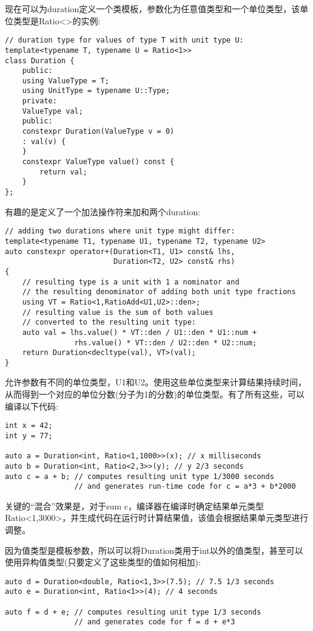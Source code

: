 现在可以为duration定义一个类模板，参数化为任意值类型和一个单位类型，该单位类型是Ratio<>的实例:

\begin{lstlisting}[style=styleCXX]
// duration type for values of type T with unit type U:
template<typename T, typename U = Ratio<1>>
class Duration {
	public:
	using ValueType = T;
	using UnitType = typename U::Type;
	private:
	ValueType val;
	public:
	constexpr Duration(ValueType v = 0)
	: val(v) {
	}
	constexpr ValueType value() const {
		return val;
	}
};
\end{lstlisting}

有趣的是定义了一个加法操作符来加和两个duration:

\begin{lstlisting}[style=styleCXX]
// adding two durations where unit type might differ:
template<typename T1, typename U1, typename T2, typename U2>
auto constexpr operator+(Duration<T1, U1> const& lhs,
						 Duration<T2, U2> const& rhs)
{
	// resulting type is a unit with 1 a nominator and
	// the resulting denominator of adding both unit type fractions
	using VT = Ratio<1,RatioAdd<U1,U2>::den>;
	// resulting value is the sum of both values
	// converted to the resulting unit type:
	auto val = lhs.value() * VT::den / U1::den * U1::num +
				rhs.value() * VT::den / U2::den * U2::num;
	return Duration<decltype(val), VT>(val);
}
\end{lstlisting}

允许参数有不同的单位类型，U1和U2。使用这些单位类型来计算结果持续时间，从而得到一个对应的单位分数(分子为1的分数)的单位类型。有了所有这些，可以编译以下代码:

\begin{lstlisting}[style=styleCXX]
int x = 42;
int y = 77;

auto a = Duration<int, Ratio<1,1000>>(x); // x milliseconds
auto b = Duration<int, Ratio<2,3>>(y); // y 2/3 seconds
auto c = a + b; // computes resulting unit type 1/3000 seconds
				// and generates run-time code for c = a*3 + b*2000
\end{lstlisting}

关键的“混合”效果是，对于sum c，编译器在编译时确定结果单元类型Ratio<1,3000>，并生成代码在运行时计算结果值，该值会根据结果单元类型进行调整。

因为值类型是模板参数，所以可以将Duration类用于int以外的值类型，甚至可以使用异构值类型(只要定义了这些类型的值如何相加):

\begin{lstlisting}[style=styleCXX]
auto d = Duration<double, Ratio<1,3>>(7.5); // 7.5 1/3 seconds
auto e = Duration<int, Ratio<1>>(4); // 4 seconds

auto f = d + e; // computes resulting unit type 1/3 seconds
				// and generates code for f = d + e*3
\end{lstlisting}

